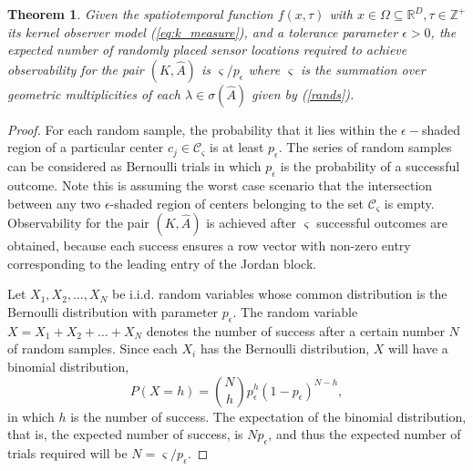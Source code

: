 \documentclass[letterpaper,12pt,peerreviewca,draftcls]{IEEEtran}
\newtheorem{theorem}{Theorem}%
\newcommand{\e}{\epsilon}
\newcommand{\empK}{\ensuremath{K}}
\newcommand{\dom}{\Omega}
\newcommand{\nsamp}{N}
\newcommand{\shCent}{\mathcal{C}}
\renewcommand{\eqref}[1]{(\ref{eq:#1})}
\newcommand{\dimI}{\ensuremath{D}}
\newcommand{\dualop}{A}
\newcommand{\dualopApprox}{\widehat{\dualop}}
\newcommand{\tindex}{\tau}
\newcommand{\rands}{\varsigma}
\begin{document}
\begin{theorem}\label{thm:r1}
	Given the spatiotemporal function $ f(x,\tindex) $ with $ x \in \dom \subseteq  \mathbb{R}^\dimI, \tindex\in \mathbb{Z}^+  $ its kernel observer model \eqref{k_measure}, and a tolerance parameter $\e>0$, the expected number of randomly placed sensor locations required to achieve observability for the pair $ (\empK,\dualopApprox) $ is $ \rands/{p_{\e}} $ where $ \rands $ is the summation over geometric multiplicities of each $ \lambda \in \sigma(\dualopApprox) $  given by  (\ref{rands}).
\end{theorem}
\begin{proof}
	For each random sample, the probability that it lies within the $ \epsilon- $shaded region of a particular center $ c_j \in \shCent_\rands$
	is at least $ p_{\e} $. The series of random samples can be considered as Bernoulli trials in which $p_{\e}$ is the probability of a successful outcome. Note this is assuming the worst case scenario that the intersection between any two $ \epsilon $-shaded region of centers belonging to the set  $ \shCent_\rands $ is empty. Observability for the pair $ (\empK, \dualopApprox) $ is achieved after $ \rands  $ successful outcomes are obtained, because each success ensures a row vector with non-zero entry corresponding to the leading entry of the Jordan block. 
	
	Let $ X_1, X_2, \dots, X_\nsamp $ be i.i.d. random variables whose common distribution is the Bernoulli distribution with parameter $p_{\e}$. The random variable $ X = X_1 + X_2+ \dots+ X_\nsamp $ denotes the number of success after a certain number $ \nsamp $ of random samples. Since each $ X_i $ has the Bernoulli distribution, $ X $ will have a binomial distribution, 
	\begin{equation*}
	P(X=h) = \binom{\nsamp}{h}p_{\e}^h (1-p_{\e})^{\nsamp-h},
	\end{equation*}
	in which $ h  $ is the number of success. The expectation of the binomial distribution, that is, the expected number of success, is $ Np_{\e} $, and thus the expected number of trials required will be $ N = \rands/p_{\e}$.
\end{proof}
\end{document}

